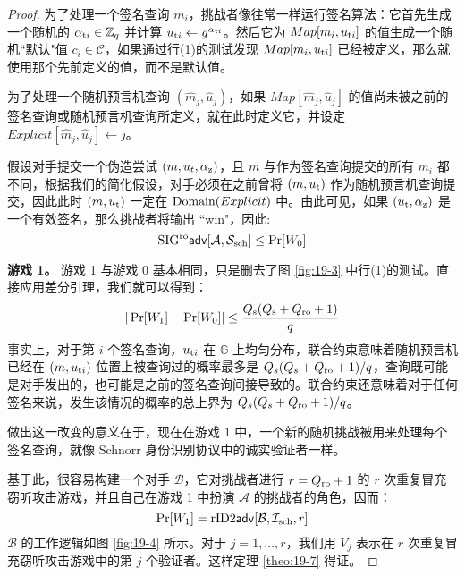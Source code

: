 \begin{proof}
为了处理一个签名查询 $m_i$，挑战者像往常一样运行签名算法：它首先生成一个随机的 $\alpha_{{\rm t}i}\in\mathbb{Z}_q$ 并计算 $u_{{\rm t}i}\leftarrow g^{\alpha_{{\rm t}i}}$。然后它为 $Map[m_i,u_{{\rm t}i}]$ 的值生成一个随机``默认"值 $c_i\in\mathcal{C}$，如果通过行(1)的测试发现 $Map[m_i,u_{{\rm t}i}]$ 已经被定义，那么就使用那个先前定义的值，而不是默认值。

为了处理一个随机预言机查询 $(\widehat m_j,\widehat u_j)$，如果 $Map[\widehat m_j,\widehat u_j]$ 的值尚未被之前的签名查询或随机预言机查询所定义，就在此时定义它，并设定 $Explicit[\widehat m_j,\widehat u_j]\leftarrow j$。

假设对手提交一个伪造尝试 $(m,u_t,\alpha_{\rm z})$，且 $m$ 与作为签名查询提交的所有 $m_i$ 都不同，根据我们的简化假设，对手必须在之前曾将 $(m,u_{\rm t})$ 作为随机预言机查询提交，因此此时 $(m,u_{\rm t})$ 一定在 ${\rm Domain}(Explicit)$ 中。由此可见，如果 $(u_{\rm t},\alpha_{\rm z})$ 是一个有效签名，那么挑战者将输出 ``win"，因此:
\[
{\rm SIG^{ro}\mathsf{adv}}[\mathcal{A}, \mathcal{S}_{\rm sch}]\leq\Pr[W_0]
\]

\noindent
\textbf{游戏 1。}
游戏 1 与游戏 0 基本相同，只是删去了图 \ref{fig:19-3} 中行(1)的测试。直接应用差分引理，我们就可以得到：
\[
|\Pr[W_1]-\Pr[W_0]|\leq\frac{Q_{\rm s}(Q_{\rm s}+Q_{\rm ro}+1)}{q}
\]
事实上，对于第 $i$ 个签名查询，$u_{{\rm t}i}$ 在 $\mathbb{G}$ 上均匀分布，联合约束意味着随机预言机已经在 $(m,u_{{\rm t}i})$ 位置上被查询过的概率最多是 ${Q_s(Q_s+Q_{\rm ro}+1)}/{q}$，查询既可能是对手发出的，也可能是之前的签名查询间接导致的。联合约束还意味着对于任何签名来说，发生该情况的概率的总上界为 ${Q_s(Q_s+Q_{\rm ro}+1)}/{q}$。

做出这一改变的意义在于，现在在游戏 1 中，一个新的随机挑战被用来处理每个签名查询，就像 Schnorr 身份识别协议中的诚实验证者一样。

基于此，很容易构建一个对手 $\mathcal{B}$，它对挑战者进行 $r=Q_{\rm ro}+1$ 的 $r$ 次重复冒充窃听攻击游戏，并且自己在游戏 1 中扮演 $\mathcal{A}$ 的挑战者的角色，因而：
\[
\Pr[W_1] = {\rm rID2\mathsf{adv}}[\mathcal{B},\mathcal{I}_{\rm sch},r]
\]
$\mathcal{B}$ 的工作逻辑如图 \ref{fig:19-4} 所示。对于 $j=1,\dots,r$，我们用 $V_j$ 表示在 $r$ 次重复冒充窃听攻击游戏中的第 $j$ 个验证者。这样定理 \ref{theo:19-7} 得证。
\end{proof}

